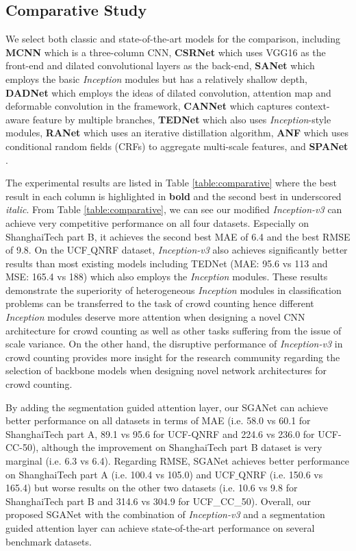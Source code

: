\documentclass[journal,comsoc]{IEEEtran}
\begin{document}
\subsection{Comparative Study} \label{sec:comparative}
We select both classic and state-of-the-art models for the comparison, including \textbf{MCNN} \cite{zhang2016single} which is a three-column CNN, \textbf{CSRNet} \cite{li2018csrnet} which uses VGG16 as the front-end and dilated convolutional layers as the back-end, \textbf{SANet} \cite{cao2018scale} which employs the basic \textit{Inception} modules but has a relatively shallow depth, \textbf{DADNet} \cite{guo2019dadnet} which employs the ideas of dilated convolution, attention map and deformable convolution in the framework, \textbf{CANNet} \cite{liu2019context} which captures context-aware feature by multiple branches, \textbf{TEDNet} \cite{jiang2019crowd} which also uses \textit{Inception}-style modules, \textbf{RANet} \cite{zhang2019relational} which uses an iterative distillation algorithm, \textbf{ANF} \cite{zhang2019attentional} which uses conditional random fields (CRFs) to aggregate multi-scale features, and \textbf{SPANet} \cite{cheng2019learning}.  



The experimental results are listed in Table \ref{table:comparative} where the best result in each column is highlighted in \textbf{bold} and the second best in underscored \textit{italic}. From Table \ref{table:comparative}, we can see our modified \textit{Inception-v3} can achieve very competitive performance on all four datasets. Especially on ShanghaiTech part B, it achieves the second best MAE of 6.4 and the best RMSE of 9.8. On the UCF$\_$QNRF dataset, \textit{Inception-v3} also achieves significantly better results than 
most existing models including TEDNet (MAE: 95.6 vs 113 and MSE: 165.4 vs 188) which also employs the \textit{Inception} modules. These results demonstrate the superiority of heterogeneous \textit{Inception} modules in classification problems can be transferred to the task of crowd counting hence different \textit{Inception} modules deserve more attention when designing a novel CNN architecture for crowd counting as well as other tasks suffering from the issue of scale variance. On the other hand, the disruptive performance of \textit{Inception-v3} in crowd counting provides more insight for the research community regarding the selection of backbone models when designing novel network architectures for crowd counting.

By adding the segmentation guided attention layer, our SGANet can achieve better performance on all datasets in terms of MAE (i.e. 58.0 vs 60.1 for ShanghaiTech part A, 89.1 vs 95.6 for UCF-QNRF and 224.6 vs 236.0 for UCF-CC-50), although the improvement on ShanghaiTech part B dataset is very marginal (i.e. 6.3 vs 6.4). Regarding RMSE, SGANet achieves better performance on ShanghaiTech part A (i.e. 100.4 vs 105.0) and UCF$\_$QNRF (i.e. 150.6 vs 165.4) but worse results on the other two datasets (i.e. 10.6 vs 9.8 for ShanghaiTech part B and 314.6 vs 304.9 for UCF\_CC\_50). Overall, our proposed SGANet with the combination of \textit{Inception-v3} and a segmentation guided attention layer can achieve state-of-the-art performance on several benchmark datasets.
\end{document}
